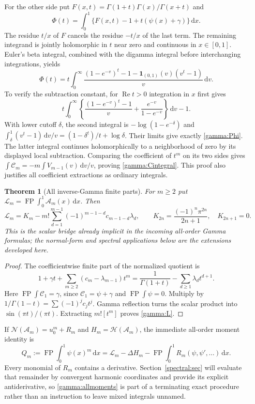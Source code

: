 \documentclass[11pt,a4paper]{article}
\numberwithin{equation}{section}
\newtheorem{theorem}{Theorem}[section]
\theoremstyle{definition}
\theoremstyle{remark}
\DeclareMathOperator{\FP}{FP}
\newcommand{\re}{\operatorname{Re}}
\newcommand{\dd}{\,\mathrm d}
\newcommand{\A}{\mathcal A}
\newcommand{\NN}{\mathcal N}
\newcommand{\HH}{\mathcal H}
\begin{document}
For the other side put
$F(x,t)=\Gamma(1+t)\Gamma(x)/\Gamma(x+t)$ and
\[
 \Phi(t)=\int_0^1\{F(x,t)-1+t(\psi(x)+\gamma)\}\dd x.
\]
The residue $t/x$ of $F$ cancels the residue $-t/x$ of the last
term.  The remaining integrand is jointly holomorphic in $t$ near
zero and continuous in $x\in[0,1]$.
Euler's beta integral, combined with the digamma integral before
interchanging integrations, yields
\begin{equation}\label{gamma:Phi}
 \Phi(t)=t\int_0^\infty
 \frac{(1-e^{-v})^t-1-\boldsymbol1_{(0,1)}(v)(v^t-1)}v\dd v.
\end{equation}
To verify the subtraction constant, for $\re t>0$ integration in
$x$ first gives
\[
 t\int_0^\infty
 \left\{\frac{(1-e^{-v})^t-1}{v}
              +\frac{e^{-v}}{1-e^{-v}}\right\}\dd v-1.
\]
With lower cutoff $\delta$, the second integral is
$-\log(1-e^{-\delta})$ and
$\int_\delta^1(v^t-1)\dd v/v=(1-\delta^t)/t+\log\delta$.
Their limits give exactly \eqref{gamma:Phi}.
The latter integral continues holomorphically to a neighborhood of
zero by its displayed local subtraction.  Comparing the coefficient
of $t^m$ on its two sides gives
$\int\mathcal C_m=-m\int V_{m-1}(v)\dd v/v$, proving
\eqref{gamma:Cintegral}.  This proof also justifies all coefficient
extractions as ordinary integrals.

\begin{theorem}[All inverse-Gamma finite parts]
\label{gamma:scalar}
For $m\ge2$ put $\mathcal L_m=\FP\int_0^1\A_m(x)\dd x$.
Then
\begin{equation}\label{gamma:L}
 \boxed{\displaystyle
 \mathcal L_m=K_m-m!\sum_{d=1}^{m-1}
       (-1)^{m-1-d}c_{m-1-d}\lambda_d,\qquad
 K_{2n}=\frac{(-1)^n\pi^{2n}}{2n+1},\quad K_{2n+1}=0.}
\end{equation}
This is the scalar bridge already implicit in the incoming all-order
Gamma formulas; the normal-form and spectral applications below
are the extensions developed here.
\end{theorem}
\begin{proof}
The coefficientwise finite part of the normalized quotient is
\[
 1+\gamma t+\sum_{m\ge2}(c_m-\lambda_{m-1})t^m
 =\frac1{\Gamma(1+t)}-\sum_{d\ge1}\lambda_d t^{d+1}.
\]
Here $\FP\int\mathcal C_1=\gamma$, since
$\mathcal C_1=\psi+\gamma$ and $\FP\int\psi=0$.
Multiply by $1/\Gamma(1-t)=\sum(-1)^jc_jt^j$.
Gamma reflection turns the scalar product into
$\sin(\pi t)/(\pi t)$.  Extracting $m![t^m]$ proves
\eqref{gamma:L}.
\end{proof}

If
$\NN(\A_m)=u_0^m+R_m$ and $H_m=\HH(\A_m)$, the immediate
all-order moment identity is
\begin{equation}\label{gamma:allmoments}
 \boxed{\displaystyle
 Q_m:=\FP\int_0^1\psi(x)^m\dd x
   =\mathcal L_m-\Delta H_m
       -\FP\int_0^1R_m(\psi,\psi',\ldots)\dd x.}
\end{equation}
Every monomial of $R_m$ contains a derivative.  Section~\ref{spectral:sec}
will evaluate that remainder by convergent harmonic coordinates and
provide its explicit antiderivative, so \eqref{gamma:allmoments} is
part of a terminating exact procedure rather than an instruction to
leave mixed integrals unnamed.
\end{document}
